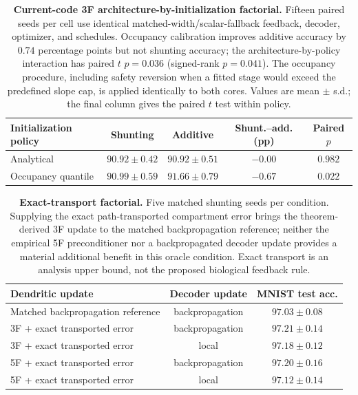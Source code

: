    \begin{table}[htbp]
    \centering
    \small
    \begin{tabular}{@{}lcccc@{}}
    \toprule
    \textbf{Initialization policy} & \textbf{Shunting} & \textbf{Additive} &
    \textbf{Shunt.--add. (pp)} & \textbf{Paired $p$} \\
    \midrule
    Analytical & $90.92\pm0.42$ & $90.92\pm0.51$ & $-0.00$ & $0.982$ \\
    Occupancy quantile & $90.99\pm0.59$ & $91.66\pm0.79$ & $-0.67$ & $0.022$ \\
    \bottomrule
    \end{tabular}
    \caption{\textbf{Current-code 3F architecture-by-initialization factorial.}
    Fifteen paired seeds per cell use identical matched-width/scalar-fallback feedback, decoder, optimizer, and schedules. Occupancy calibration improves additive accuracy by $0.74$ percentage points but not shunting accuracy; the architecture-by-policy interaction has paired $t$ $p=0.036$ (signed-rank $p=0.041$). The occupancy procedure, including safety reversion when a fitted stage would exceed the predefined slope cap, is applied identically to both cores. Values are mean $\pm$ s.d.; the final column gives the paired $t$ test within policy.}
    \label{tab:init_policy_factorial}
    \end{table}

    \begin{table}[htbp]
    \centering
    \small
    \begin{tabular}{@{}lcc@{}}
    \toprule
    \textbf{Dendritic update} & \textbf{Decoder update} & \textbf{MNIST test acc.} \\
    \midrule
    Matched backpropagation reference & backpropagation & $97.03\pm0.08$ \\
    \midrule
    3F + exact transported error & backpropagation & $97.21\pm0.14$ \\
    3F + exact transported error & local & $97.18\pm0.12$ \\
    5F + exact transported error & backpropagation & $97.20\pm0.16$ \\
    5F + exact transported error & local & $97.12\pm0.14$ \\
    \bottomrule
    \end{tabular}
    \caption{\textbf{Exact-transport factorial.} Five matched shunting seeds per condition. Supplying the exact path-transported compartment error brings the theorem-derived 3F update to the matched backpropagation reference; neither the empirical 5F preconditioner nor a backpropagated decoder update provides a material additional benefit in this oracle condition. Exact transport is an analysis upper bound, not the proposed biological feedback rule.}
    \label{tab:exact_transport_factorial}
    \end{table}

